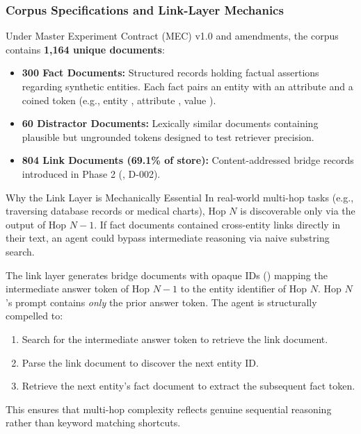 \subsubsection{Corpus Specifications and Link-Layer Mechanics}
Under Master Experiment Contract (MEC) v1.0 and amendments, the corpus contains \textbf{1,164 unique documents}:
\begin{itemize}
    \item \textbf{300 Fact Documents:} Structured records holding factual assertions regarding synthetic entities. Each fact pairs an entity with an attribute and a coined token (e.g., entity , attribute , value ).
    \item \textbf{60 Distractor Documents:} Lexically similar documents containing plausible but ungrounded tokens designed to test retriever precision.
    \item \textbf{804 Link Documents (69.1\% of store):} Content-addressed bridge records introduced in Phase 2 (, D-002).
\end{itemize}

\begin{callout}[secondary]{Why the Link Layer is Mechanically Essential}
In real-world multi-hop tasks (e.g., traversing database records or medical charts), Hop $N$ is discoverable only via the output of Hop $N-1$. If fact documents contained cross-entity links directly in their text, an agent could bypass intermediate reasoning via naive substring search. 

The link layer generates bridge documents with opaque IDs () mapping the intermediate answer token of Hop $N-1$ to the entity identifier of Hop $N$. Hop $N$'s prompt contains \textit{only} the prior answer token. The agent is structurally compelled to:
\begin{enumerate}
    \item Search for the intermediate answer token to retrieve the link document.
    \item Parse the link document to discover the next entity ID.
    \item Retrieve the next entity's fact document to extract the subsequent fact token.
\end{enumerate}
This ensures that multi-hop complexity reflects genuine sequential reasoning rather than keyword matching shortcuts.
\end{callout}

